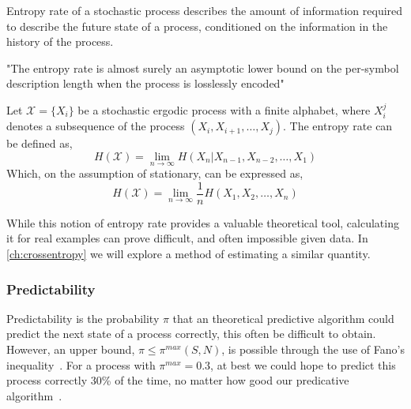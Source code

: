 Entropy rate of a stochastic process describes the amount of information required to describe the future state of a process, conditioned on the information in the history of the process.

"The entropy rate is almost surely an asymptotic lower bound on the per-symbol description length when the process is losslessly encoded" 

\begin{definition}\label{def:entropyrate}
	Let  $\mathcal{X}= \{ X_i \}$ be a stochastic ergodic process with a finite alphabet, where $X_i^j$ denotes a subsequence of the process $(X_{i}, X_{i+1}, \ldots, X_{j})$.
	The entropy rate can be defined as,
	\begin{equation}\label{eq:entropyrate}
	H(\mathcal{X})=\lim _{n \rightarrow \infty} H\left(X_{n} | X_{n-1}, X_{n-2}, \ldots, X_{1}\right)
	\end{equation}
	Which, on the assumption of stationary, can be expressed as,
	\begin{equation}
	H(\mathcal{X})=\lim _{n \rightarrow \infty} \frac{1}{n} H\left(X_{1}, X_{2}, \ldots, X_{n}\right)
	\end{equation}
\end{definition}

While this notion of entropy rate provides a valuable theoretical tool, calculating it for real examples can prove difficult, and often impossible given data. In \autoref{ch:crossentropy} we will explore a method of estimating a similar quantity.

\label{proof:iidentroptrate}

\subsubsection{Predictability}

Predictability is the probability $\pi$ that an theoretical predictive algorithm could predict the next state of a process correctly, this often be difficult to obtain. However, an upper bound, $\pi \leq \pi^{max}(S,N)$, is possible through the use of Fano's inequality~\cite{fano_transmission_1961}. For a process with $\pi^{max} = 0.3$, at best we could hope to predict this process correctly 30\% of the time, no matter how good our predicative algorithm~\cite{song_limits_2010}.


